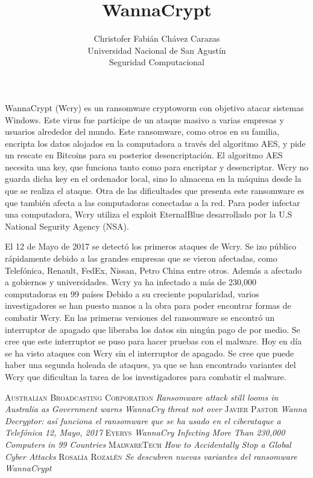 \documentclass[a4paper,12pt]{article}
\begin{document}
\title{WannaCrypt}
\author{
Christofer Fabián Chávez Carazas \\
\small{Universidad Nacional de San Agustín} \\
\small{Seguridad Computacional}
}

\maketitle

WannaCrypt (Wcry) es un ransomware cryptoworm con objetivo atacar sistemas Windows. Este virus fue partícipe de un ataque masivo a 
varias empresas y usuarios alrededor del mundo. \cite{1} Este ransomware, como otros en su familia,
encripta los datos alojados en la computadora a través del algoritmo AES, y pide un rescate en Bitcoins para su posterior
desencriptación. El algoritmo AES necesita una key, que funciona tanto como para encriptar y desencriptar. Wcry no guarda dicha
key en el ordenador local, sino lo almacena en la máquina desde la que se realiza el ataque. Otra de las dificultades que presenta
este ransomware es que también afecta a las computadoras conectadas a la red. \cite{2} Para poder infectar una computadora, Wcry utiliza
el exploit EternalBlue desarrollado por la U.S National Segurity Agency (NSA). \par

El 12 de Mayo de 2017 se detectó los primeros ataques de Wcry. Se izo público rápidamente debido a las grandes empresas
que se vieron afectadas, como Telefónica, Renault, FedEx, Nissan, Petro China entre otros. Además a afectado a gobiernos y
universidades. Wcry ya ha infectado a más de 230,000 computadoras en 99 países \cite{3} Debido a su creciente popularidad, varios investigadores se han puesto manos a la obra para poder encontrar
formas de combatir Wcry. En las primeras versiones del ransomware se encontró un interruptor de apagado \cite{4} que liberaba los datos
sin ningún pago de por medio. Se cree que este interruptor se puso para hacer pruebas con el malware. Hoy en día se ha visto 
ataques con Wcry sin el interruptor de apagado.
Se cree que puede haber una segunda holeada de ataques, ya que se han encontrado variantes del Wcry que dificultan la tarea
de los investigadores para combatir el malware. \cite{5}

\begin{thebibliography}{X}
   \textsc{Australian Broadcasting Corporation} \textit{Ransomware attack still looms in Australia as Government warns WannaCry threat not over}  
   \textsc{Javier Pastor} \textit{Wanna Decryptor: así funciona el ransomware que se ha usado en el ciberataque a Telefónica 12, Mayo, 2017}  
   \textsc{Eyerys} \textit{WannaCry Infecting More Than 230,000 Computers in 99 Countries}  
   \textsc{MalwareTech} \textit{How to Accidentally Stop a Global Cyber Attacks}  
   \textsc{Rosalía Rozalén} \textit{Se descubren nuevas variantes del ransomware WannaCrypt}  
  
  
  
\end{thebibliography}
\end{document}
